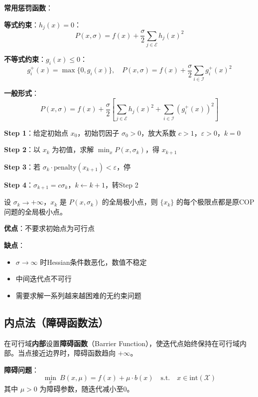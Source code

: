 \textbf{常用惩罚函数}：

\textbf{等式约束}：$h_j(x) = 0$：
\[
P(x, \sigma) = f(x) + \frac{\sigma}{2}\sum_{j \in \mathcal{E}} h_j(x)^2
\]

\textbf{不等式约束}：$g_i(x) \leq 0$：
\[
g_i^+(x) = \max\{0, g_i(x)\},\quad
P(x, \sigma) = f(x) + \frac{\sigma}{2}\sum_{i \in \mathcal{I}} g_i^+(x)^2
\]

\textbf{一般形式}：
\[
P(x, \sigma) = f(x) + \frac{\sigma}{2}\left[\sum_{j \in \mathcal{E}} h_j(x)^2 + \sum_{i \in \mathcal{I}} (g_i^+(x))^2\right]
\]

\begin{algobox}[外点罚函数法算法]
\textbf{Step 1}：给定初始点 $x_0$，初始罚因子 $\sigma_0 > 0$，放大系数 $c > 1$，$\varepsilon > 0$，$k = 0$

\textbf{Step 2}：以 $x_k$ 为初值，求解 $\min_x P(x, \sigma_k)$，得 $x_{k+1}$

\textbf{Step 3}：若 $\sigma_k \cdot \text{penalty}(x_{k+1}) < \varepsilon$，停

\textbf{Step 4}：$\sigma_{k+1} = c \sigma_k$，$k \leftarrow k+1$，转Step 2
\end{algobox}

\begin{theorem}[外点罚函数法收敛性]
设 $\sigma_k \to +\infty$，$x_k$ 是 $P(x, \sigma_k)$ 的全局极小点，则 $\{x_k\}$ 的每个极限点都是原COP问题的全局极小点。
\end{theorem}

\begin{notebox}[外点罚函数法的优缺点]
\textbf{优点}：不要求初始点为可行点

\textbf{缺点}：
\begin{itemize}
    \item $\sigma \to \infty$ 时Hessian条件数恶化，数值不稳定
    \item 中间迭代点不可行
    \item 需要求解一系列越来越困难的无约束问题
\end{itemize}
\end{notebox}

\subsection{内点法（障碍函数法）}

\begin{conceptbox}[内点法思想]
在可行域\textbf{内部}设置\textbf{障碍函数}（Barrier Function），使迭代点始终保持在可行域内部。当点接近边界时，障碍函数趋向 $+\infty$。

\textbf{障碍问题}：
\[
\min_x\ B(x, \mu) = f(x) + \mu \cdot b(x)\quad \text{s.t.}\quad x \in \text{int}(\mathcal{X})
\]
其中 $\mu > 0$ 为障碍参数，随迭代减小至0。
\end{conceptbox}

